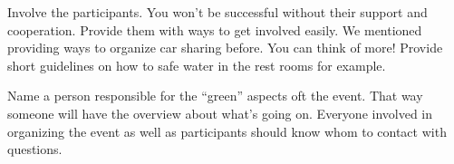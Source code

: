 \begin{suggest}{Involve the participants.}
	You won't be successful without their support and cooperation. Provide them with ways to get involved easily. We mentioned providing ways to organize car sharing before. You can think of more! Provide short guidelines on how to safe water in the rest rooms for example.
\end{suggest}

\begin{suggest}{Name a person responsible for the ``green'' aspects oft the event.}
	That way someone will have the overview about what's going on. Everyone involved in organizing the event as well as participants should know whom to contact with questions.
\end{suggest}
